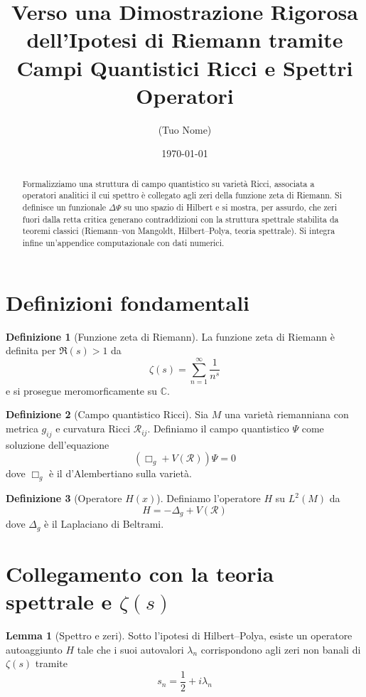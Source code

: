 \documentclass[12pt]{article}
\title{Verso una Dimostrazione Rigorosa dell’Ipotesi di Riemann tramite Campi Quantistici Ricci e Spettri Operatori}
\author{(Tuo Nome)}
\date{\today}
\theoremstyle{definition}
\newtheorem{defn}{Definizione}
\newtheorem{lem}{Lemma}
\begin{document}
\maketitle
\begin{abstract}
Formalizziamo una struttura di campo quantistico su varietà Ricci, associata a operatori analitici il cui spettro è collegato agli zeri della funzione zeta di Riemann. Si definisce un funzionale $\Delta\Psi$ su uno spazio di Hilbert e si mostra, per assurdo, che zeri fuori dalla retta critica generano contraddizioni con la struttura spettrale stabilita da teoremi classici (Riemann–von Mangoldt, Hilbert–Polya, teoria spettrale). Si integra infine un’appendice computazionale con dati numerici.
\end{abstract}

\section{Definizioni fondamentali}

\begin{defn}[Funzione zeta di Riemann]
La funzione zeta di Riemann è definita per $\Re(s)>1$ da
\[
\zeta(s) = \sum_{n=1}^\infty \frac{1}{n^s}
\]
e si prosegue meromorficamente su $\mathbb{C}$.
\end{defn}

\begin{defn}[Campo quantistico Ricci]
Sia $M$ una varietà riemanniana con metrica $g_{ij}$ e curvatura Ricci $\mathcal{R}_{ij}$. Definiamo il campo quantistico $\Psi$ come soluzione dell’equazione
\[
(\Box_g + V(\mathcal{R}))\Psi = 0
\]
dove $\Box_g$ è il d’Alembertiano sulla varietà.
\end{defn}

\begin{defn}[Operatore $H(x)$]
Definiamo l’operatore $H$ su $L^2(M)$ da
\[
H = -\Delta_g + V(\mathcal{R})
\]
dove $\Delta_g$ è il Laplaciano di Beltrami.
\end{defn}

\section{Collegamento con la teoria spettrale e $\zeta(s)$}

\begin{lem}[Spettro e zeri]
Sotto l’ipotesi di Hilbert–Polya, esiste un operatore autoaggiunto $H$ tale che i suoi autovalori $\lambda_n$ corrispondono agli zeri non banali di $\zeta(s)$ tramite
\[
s_n = \frac{1}{2} + i\lambda_n
\]
\end{lem}
\end{document}
